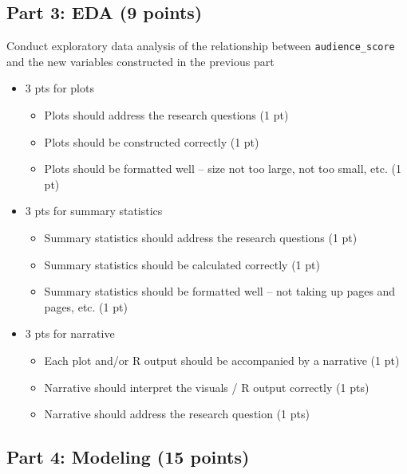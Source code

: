 \documentclass[
]{article}
\providecommand{\tightlist}{%
  \setlength{\itemsep}{0pt}\setlength{\parskip}{0pt}}
\begin{document}
\hypertarget{part-3-eda-9-points}{%
\subsection{Part 3: EDA (9 points)}\label{part-3-eda-9-points}}

Conduct exploratory data analysis of the relationship between
\texttt{audience\_score} and the new variables constructed in the
previous part

\begin{itemize}
\tightlist
\item
  3 pts for plots

  \begin{itemize}
  \tightlist
  \item
    Plots should address the research questions (1 pt)
  \item
    Plots should be constructed correctly (1 pt)
  \item
    Plots should be formatted well -- size not too large, not too small,
    etc. (1 pt)
  \end{itemize}
\item
  3 pts for summary statistics

  \begin{itemize}
  \tightlist
  \item
    Summary statistics should address the research questions (1 pt)
  \item
    Summary statistics should be calculated correctly (1 pt)
  \item
    Summary statistics should be formatted well -- not taking up pages
    and pages, etc. (1 pt)
  \end{itemize}
\item
  3 pts for narrative

  \begin{itemize}
  \tightlist
  \item
    Each plot and/or R output should be accompanied by a narrative (1
    pt)
  \item
    Narrative should interpret the visuals / R output correctly (1 pts)
  \item
    Narrative should address the research question (1 pts)
  \end{itemize}
\end{itemize}

\hypertarget{part-4-modeling-15-points}{%
\subsection{Part 4: Modeling (15
points)}\label{part-4-modeling-15-points}}
\end{document}
